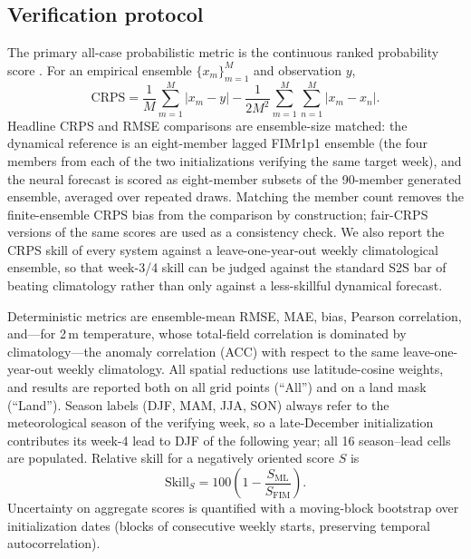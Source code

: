 \documentclass[11pt]{article}
\newcommand{\modelshort}{FIMr1p1}
\begin{document}
\subsection{Verification protocol}

The primary all-case probabilistic metric is the continuous ranked probability score \citep{MathesonWinkler1976,Hersbach2000,GneitingRaftery2007}. For an empirical ensemble $\{x_m\}_{m=1}^{M}$ and observation $y$,
\begin{equation}
  \mathrm{CRPS} =
  \frac{1}{M}\sum_{m=1}^{M}\lvert x_m-y\rvert
  - \frac{1}{2M^2}\sum_{m=1}^{M}\sum_{n=1}^{M}\lvert x_m-x_n\rvert .
\end{equation}
Headline CRPS and RMSE comparisons are ensemble-size matched: the dynamical reference is an eight-member lagged \modelshort{} ensemble (the four members from each of the two initializations verifying the same target week), and the neural forecast is scored as eight-member subsets of the 90-member generated ensemble, averaged over repeated draws. Matching the member count removes the finite-ensemble CRPS bias \citep{Ferro2014} from the comparison by construction; fair-CRPS versions of the same scores are used as a consistency check. We also report the CRPS skill of every system against a leave-one-year-out weekly climatological ensemble, so that week-3/4 skill can be judged against the standard S2S bar of beating climatology rather than only against a less-skillful dynamical forecast.

Deterministic metrics are ensemble-mean RMSE, MAE, bias, Pearson correlation, and---for 2\,m temperature, whose total-field correlation is dominated by climatology---the anomaly correlation (ACC) with respect to the same leave-one-year-out weekly climatology. All spatial reductions use latitude-cosine weights, and results are reported both on all grid points (``All'') and on a land mask (``Land''). Season labels (DJF, MAM, JJA, SON) always refer to the meteorological season of the verifying week, so a late-December initialization contributes its week-4 lead to DJF of the following year; all 16 season--lead cells are populated. Relative skill for a negatively oriented score $S$ is
\begin{equation}
  \mathrm{Skill}_{S} = 100\left(1 - \frac{S_{\mathrm{ML}}}{S_{\mathrm{FIM}}}\right).
\label{eq:skill}
\end{equation}
Uncertainty on aggregate scores is quantified with a moving-block bootstrap over initialization dates (blocks of consecutive weekly starts, preserving temporal autocorrelation).
\end{document}
